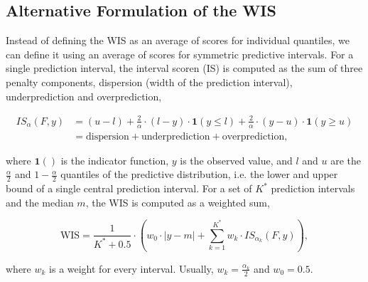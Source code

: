 \documentclass{article}
\begin{document}
\renewcommand{\thefigure}{SI.\arabic{figure}}
\setcounter{figure}{0}
\renewcommand{\thetable}{SI.\arabic{table}} \setcounter{table}{0}

\subsection{Alternative Formulation of the WIS}
\label{sec:alternative-wis}

Instead of defining the WIS as an average of scores for individual quantiles, we can define it using an average of scores for symmetric predictive intervals. For a single prediction interval, the interval scoren (IS) is computed as the sum of three penalty components, dispersion (width of the prediction interval), underprediction and overprediction,  
%
\begin{linenomath*}
\begin{align}
 IS_\alpha(F,y) &= (u-l) + \frac{2}{\alpha} \cdot (l-y) \cdot \boldsymbol{1}(y \leq l) + \frac{2}{\alpha} \cdot (y-u) \cdot \boldsymbol{1}(y \geq u) \\
 &= \text{dispersion} + \text{underprediction} + \text{overprediction},    
\end{align}
\end{linenomath*}
%
where $\boldsymbol{1}()$ is the indicator function, $y$ is the observed value, and $l$ and $u$ are the $\frac{\alpha}{2}$ and $1 - \frac{\alpha}{2}$ quantiles of the predictive distribution, i.e. the lower and upper bound of a single central prediction interval. For a set of $K^*$ prediction intervals and the median $m$, the WIS is computed as a weighted sum, 
\begin{linenomath*}
\begin{equation}
\text{WIS} = \frac{1}{K^* + 0.5} \cdot \left(w_0 \cdot |y - m| + \sum_{k = 1}^{K^*} w_k \cdot IS_{\alpha_{k}}(F, y)\right),    
\end{equation} 
\end{linenomath*}
where $w_k$ is a weight for every interval. Usually, $w_k = \frac{\alpha_k}{2}$ and $w_0 = 0.5$. 
\end{document}
